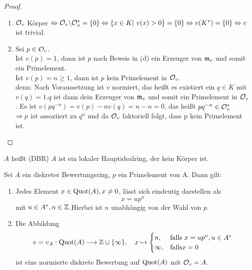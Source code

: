 \begin{proof}
\begin{enumerate} [label= \alph*)]
\begin{enumerate}
			$ \Ra \frac{b}{a} \in \br \Ra b \in (a)$.
		\end{enumerate}
		\item $\mathcal{O}_v$ Körper $\Leftrightarrow \mathcal{O}_v \backslash \mathcal{O}_v^{*} = \{0\} \Leftrightarrow \{x \in K | \ v(x) > 0 \} = \{0\} \Leftrightarrow v(K^{*}) = \{0\} \Leftrightarrow v$ ist trivial.
		\item Sei $p \in \mathcal{O}_v$. \\
		Ist $v(p) = 1$, dann ist $p$ nach Beweis in (d) ein Erzeuger von $\mathfrak{m}_v$ und somit ein Primelement. \\
		Ist $v(p) = n \geq 1 $, dann ist $p$ kein Primelement in $\mathcal{O}_v$. \\
		denn: Nach Voraussetzung ist $v$ normiert, das heißt es existiert ein $q \in K $ mit $v(q) =1$.$q$ ist dann dein Erzeuger von $\mathfrak{m}_v$ und somit ein Primelement in $\mathcal{O}_v$. Es ist $v(pq^{-n}) = v(p) -nv(q) = n -n = 0$, das heißt $pq^{-n} \in \mathcal{O}_v^{*} $\\
		$ \Rightarrow p $ ist assoziiert zu $q^n$ und da $\mathcal{O}_v$ faktoriell folgt, dass p kein Primelement ist.
	\end{enumerate}
\end{proof}
\begin{df} \label{17.4}
	$A$ heißt  (DBR)  $A$ ist ein lokaler Hauptidealring, der kein Körper ist. 
\end{df}
\begin{sa} \label{17.5}
	Sei $A$ ein diskreter Bewertungsring, $p$ ein Primelement von A. Dann gilt: 
	\begin{enumerate} [label= \alph*)]
		\item Jedes Element $x \in \operatorname{Quot}(A), x\neq 0$, lässt sich eindeutig darstellen als 
		$$ x = up^n $$ 
		mit $u \in A^{*}, n \in \mathbb{Z}$.Hierbei ist $n$ unabhängig von der Wahl von $p$. 
		\item Die Abbildung 
		$$ v = v_A: \operatorname{Quot}(A) \longrightarrow  \mathbb{Z} \cup \{\infty\}, \quad x \mapsto \begin{cases}
		n, & \text{falls} \ x = up^n, u \in A^{*} \\ \infty, & \text{falls} x = 0 
		\end{cases} $$
		ist eine normierte diskrete Bewertung auf $\operatorname{Quot}(A) $ mit $\mathcal{O}_v = A $. 
	\end{enumerate}
\end{sa}
